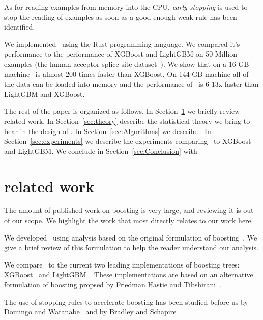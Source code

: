 As for reading examples from memory into the CPU, {\em early stopping}
is used to stop the reading of examples as soon as a good enough weak
rule has been identified.

We implemented \Sparrow\ using the Rust programming language. We
compared it's performance to the performance of XGBoost and LightGBM on
50 Million examples (the human acceptor splice site
dataset~\cite{sonnenburg_coffin_2010, agarwal_reliable_2014}). We
show that on a 16 GB machine \Sparrow\ is almost 200 times faster than
XGBoost. On 144 GB machine all of the data can be loaded into memory
and the performance of \Sparrow\ is 6-13x faster than LightGBM and XGBoost.

The rest of the paper is organized as follows. In
Section~\ref{sec:relatedWork} we briefly review related work.  In
Section~\ref{sec:theory} describe the statistical theory we bring to
bear in the design of \Sparrow. In Section~\ref{sec:Algorithms} we describe
\Sparrow. In Section~\ref{sec:experiments} we describe the experiments
comparing \Sparrow\ to XGBoost and LightGBM. We conclude in
Section~\ref{sec:Conclusion} with %

\section{related work} \label{sec:relatedWork}

The amount of published work on boosting is very large, and reviewing
it is out of our scope. We highlight the work that most directly
relates to our work here.

We developed \Sparrow\ using analysis based on the original formulation of
boosting~\cite{freund_alternating_1999, schapire_improved_1999, freund_alternating_1999, schapire_boosting:_2012}. We give a brief
review of this formulation to help the reader understand our analysis.

We compare \Sparrow\ to the current two leading implementations
of boosting trees: XGBoost~\cite{chen_xgboost:_2016} and
LightGBM~\cite{ke_lightgbm:_2017}.
These implementations are based on an alternative formulation of
boosting propsed by Friedman Hastie and
Tibshirani~\cite{friedman_additive_2000}.

The use of stopping rules to accelerate boosting has been studied 
before us by Domingo and Watanabe~\cite{domingo_scaling_2000} and by
Bradley and Schapire~\cite{bradley_filterboost:_2007}.


\iffalse

